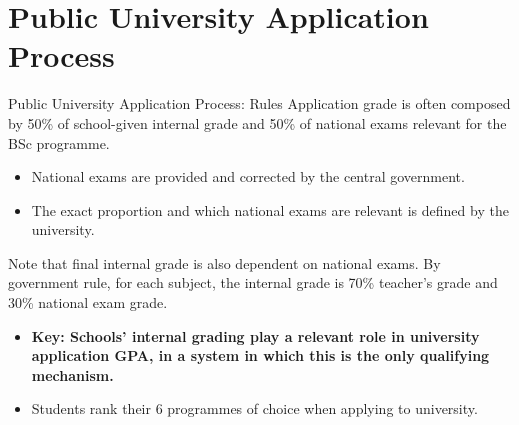 \documentclass{beamer}
\begin{document}
\section{Public University Application Process}

\begin{frame}{Public University Application Process: Rules}
    Application grade is often composed by 50\% of school-given internal grade and 50\% of national exams relevant for the BSc programme.
    \begin{itemize}
        \item National exams are provided and corrected by the central government.
        \item The exact proportion and which national exams are relevant is defined by the university.
    \end{itemize}

    Note that final internal grade is also dependent on national exams. By government rule, for each subject, the internal grade is 70\% teacher's grade and 30\% national exam grade.
     \begin{itemize}
        \item \textbf{Key: Schools' internal grading play a relevant role in university application GPA, in a system in which this is the only qualifying mechanism.}
        \item Students rank their 6 programmes of choice when applying to university.
    \end{itemize}
    
\end{frame}
\end{document}
